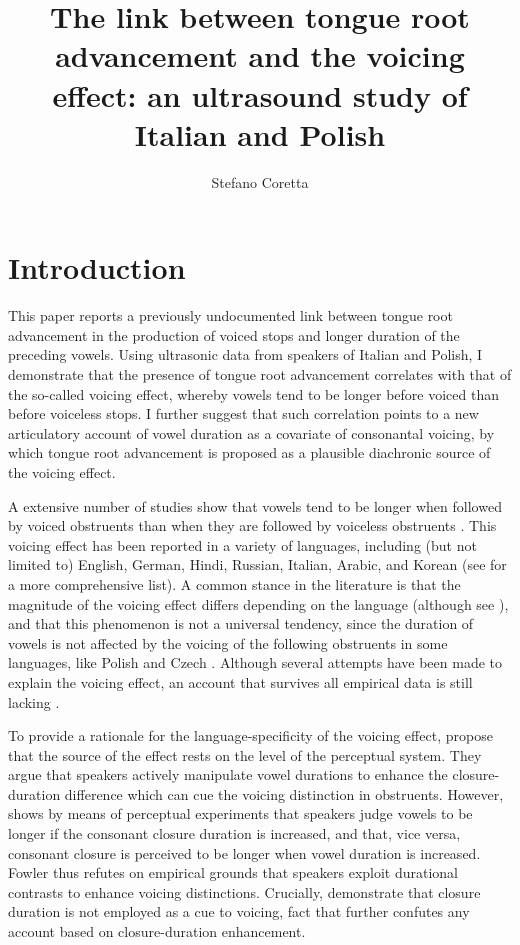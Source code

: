 \documentclass[authoryear, twocolumn]{elsarticle}
\author[mcr]{Stefano Coretta\corref{cor1}}
\title{The link between tongue root advancement and the voicing effect: an
ultrasound study of Italian and Polish}
\date{}
\begin{document}
\maketitle

\section{Introduction}\label{introduction}

\label{s:intro}

This paper reports a previously undocumented link between tongue root
advancement in the production of voiced stops and longer duration of the
preceding vowels. Using ultrasonic data from speakers of Italian and
Polish, I demonstrate that the presence of tongue root advancement
correlates with that of the so-called voicing effect, whereby vowels
tend to be longer before voiced than before voiceless stops. I further
suggest that such correlation points to a new articulatory account of
vowel duration as a covariate of consonantal voicing, by which tongue
root advancement is proposed as a plausible diachronic source of the
voicing effect.

A extensive number of studies show that vowels tend to be longer when
followed by voiced obstruents than when they are followed by voiceless
obstruents
\citep{house1953, chen1970, klatt1973, lisker1974, farnetani1986, fowler1992, hussein1994, esposito2002, lampp2004, durvasula2012}.
This voicing effect has been reported in a variety of languages,
including (but not limited to) English, German, Hindi, Russian, Italian,
Arabic, and Korean (see \citealt{maddieson1976} for a more comprehensive
list). A common stance in the literature is that the magnitude of the
voicing effect differs depending on the language (although see
\citealt{laeufer1992}), and that this phenomenon is not a universal
tendency, since the duration of vowels is not affected by the voicing of
the following obstruents in some languages, like Polish and Czech
\citep{keating1984}. Although several attempts have been made to explain
the voicing effect, an account that survives all empirical data is still
lacking \citep{durvasula2012}.

To provide a rationale for the language-specificity of the voicing
effect, \citet{kluender1988} propose that the source of the effect rests
on the level of the perceptual system. They argue that speakers actively
manipulate vowel durations to enhance the closure-duration difference
which can cue the voicing distinction in obstruents. However,
\citet{fowler1992} shows by means of perceptual experiments that
speakers judge vowels to be longer if the consonant closure duration is
increased, and that, vice versa, consonant closure is perceived to be
longer when vowel duration is increased. Fowler thus refutes on
empirical grounds that speakers exploit durational contrasts to enhance
voicing distinctions. Crucially, \citet{davis1989} demonstrate that
closure duration is not employed as a cue to voicing, fact that further
confutes any account based on closure-duration enhancement.
\end{document}
